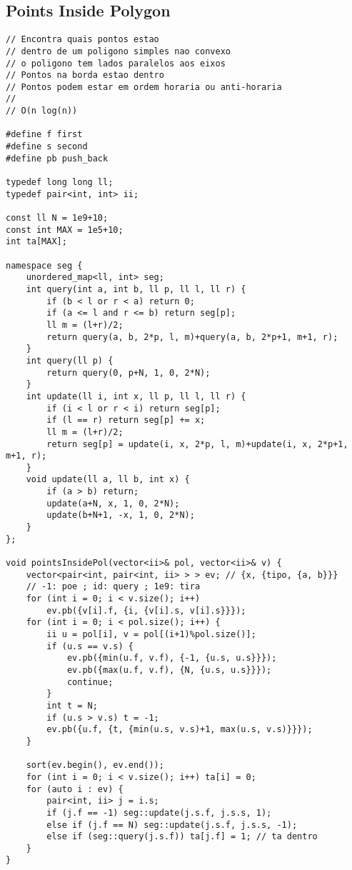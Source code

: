 \documentclass[12pt, a4paper, twoside]{article}
\begin{document}
\subsection{Points Inside Polygon}
\begin{lstlisting}
// Encontra quais pontos estao
// dentro de um poligono simples nao convexo
// o poligono tem lados paralelos aos eixos
// Pontos na borda estao dentro
// Pontos podem estar em ordem horaria ou anti-horaria
//
// O(n log(n))

#define f first
#define s second
#define pb push_back

typedef long long ll;
typedef pair<int, int> ii;

const ll N = 1e9+10;
const int MAX = 1e5+10;
int ta[MAX];

namespace seg {
	unordered_map<ll, int> seg;
	int query(int a, int b, ll p, ll l, ll r) {
		if (b < l or r < a) return 0;
		if (a <= l and r <= b) return seg[p];
		ll m = (l+r)/2;
		return query(a, b, 2*p, l, m)+query(a, b, 2*p+1, m+1, r);
	}
	int query(ll p) {
		return query(0, p+N, 1, 0, 2*N);
	}
	int update(ll i, int x, ll p, ll l, ll r) {
		if (i < l or r < i) return seg[p];
		if (l == r) return seg[p] += x;
		ll m = (l+r)/2;
		return seg[p] = update(i, x, 2*p, l, m)+update(i, x, 2*p+1, m+1, r);
	}
	void update(ll a, ll b, int x) {
		if (a > b) return;
		update(a+N, x, 1, 0, 2*N);	
		update(b+N+1, -x, 1, 0, 2*N);
	}
};

void pointsInsidePol(vector<ii>& pol, vector<ii>& v) {
	vector<pair<int, pair<int, ii> > > ev; // {x, {tipo, {a, b}}}
	// -1: poe ; id: query ; 1e9: tira
	for (int i = 0; i < v.size(); i++)
		ev.pb({v[i].f, {i, {v[i].s, v[i].s}}});
	for (int i = 0; i < pol.size(); i++) {
		ii u = pol[i], v = pol[(i+1)%pol.size()];
		if (u.s == v.s) {
			ev.pb({min(u.f, v.f), {-1, {u.s, u.s}}});
			ev.pb({max(u.f, v.f), {N, {u.s, u.s}}});
			continue;
		}
		int t = N;
		if (u.s > v.s) t = -1;
		ev.pb({u.f, {t, {min(u.s, v.s)+1, max(u.s, v.s)}}});
	}

	sort(ev.begin(), ev.end());
	for (int i = 0; i < v.size(); i++) ta[i] = 0;
	for (auto i : ev) {
		pair<int, ii> j = i.s;
		if (j.f == -1) seg::update(j.s.f, j.s.s, 1);
		else if (j.f == N) seg::update(j.s.f, j.s.s, -1);
		else if (seg::query(j.s.f)) ta[j.f] = 1; // ta dentro
	}
}
\end{lstlisting}
\end{document}
